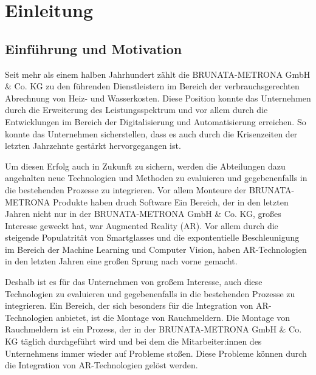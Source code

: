 \chapter{Einleitung}

\section{Einführung und Motivation}

Seit mehr als einem halben Jahrhundert zählt die BRUNATA-METRONA GmbH \& Co. KG zu den führenden Dienstleistern im Bereich der verbrauchsgerechten Abrechnung von Heiz- und Wasserkosten. Diese Position konnte das Unternehmen durch die Erweiterung des Leistungsspektrum und vor allem durch die Entwicklungen im Bereich der Digitalisierung und Automatisierung erreichen. So konnte das Unternehmen sicherstellen, dass es auch durch die Krisenzeiten der letzten Jahrzehnte gestärkt hervorgegangen ist.

Um diesen Erfolg auch in Zukunft zu sichern, werden die Abteilungen dazu angehalten neue Technologien und Methoden zu evaluieren und gegebenenfalls in die bestehenden Prozesse zu integrieren. Vor allem Monteure der BRUNATA-METRONA Produkte haben druch Software Ein Bereich, der in den letzten Jahren nicht nur in der BRUNATA-METRONA GmbH \& Co. KG, großes Interesse geweckt hat, war Augmented Reality (AR). Vor allem durch die steigende Populatrität von Smartglasses und die expontentielle Beschleunigung im Bereich der Machine Learning und Computer Vision, haben AR-Technologien in den letzten Jahren eine großen Sprung nach vorne gemacht.

Deshalb ist es für das Unternehmen von großem Interesse, auch diese Technologien zu evaluieren und gegebenenfalls in die bestehenden Prozesse zu integrieren. Ein Bereich, der sich besonders für die Integration von AR-Technologien anbietet, ist die Montage von Rauchmeldern. Die Montage von Rauchmeldern ist ein Prozess, der in der BRUNATA-METRONA GmbH \& Co. KG täglich durchgeführt wird und bei dem die Mitarbeiter:innen des Unternehmens immer wieder auf Probleme stoßen. Diese Probleme können durch die Integration von AR-Technologien gelöst werden.
